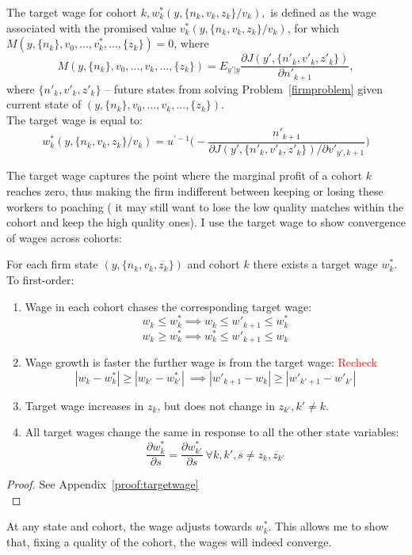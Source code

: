  \begin{definition} 
  The target wage for cohort $k, w^*_k(y,\{n_k,v_k,z_k\}/v_k),$ is defined as the wage associated with the promised value $v^*_k(y,\{n_k,v_k,z_k\}/v_k)$, for which $M(y,\{n_k\},v_0,...,v^*_k,...,\{z_k\})=0$, where
  \[M(y,\{n_k\},v_0,...,v_k,...,\{z_k\}) = E_{y'|y}\frac{\partial J(y',\{n'_k,v'_k,z'_k\})}{\partial n'_{k+1}},\]
  where $\{n'_k,v'_k,z'_k\}$ -- future states from solving Problem~\ref{firmproblem} given current state of $(y,\{n_k\},v_0,...,v_k,...,\{z_k\})$. \\
  The target wage is equal to:
  \[ w^*_k (y,\{n_k,v_k,z_k\}/v_k) = u^{'-1}\Big( - \frac{n'_{k+1}}{\partial J(y',\{n'_k,v'_k,z'_k\})/\partial v'_{y',k+1}} \Big)\]
 \end{definition}
The target wage captures the point where the marginal profit of a cohort $k$ reaches zero, thus making the firm indifferent between keeping or losing these workers to poaching ( it may still want to lose the low quality matches within the cohort and keep the high quality ones). I use the target wage to show convergence of wages across cohorts:
\begin{proposition} \label{prop:targetwage}
 For each firm state $(y,\{n_k,v_k,z_k\})$ and cohort $k$ there exists a target wage $w^*_k$. To first-order:
  \begin{enumerate}
    \item Wage in each cohort chases the corresponding target wage: 
    \[ w_k \leq w^*_k  \implies w_k \leq w'_{k+1} \leq w^*_k\]
    \[w_k \geq w^*_k  \implies w^*_k \leq w'_{k+1} \leq w_k\]
    \item Wage growth is faster the further wage is from the target wage: \textcolor{red}{Recheck} 
    \[|w_k-w^*_k|\geq|w_{k'}-w^*_{k'}|\: \implies |w'_{k+1}-w_k|\geq|w'_{k'+1}-w'_{k'}| \]
    \item Target wage increases in $z_k$, but does not change in $z_{k'},k'\neq k$.
    \item All target wages change the same in response to all the other state variables:
    \[\frac{\partial w^*_k}{\partial s} = \frac{\partial w^*_{k'}}{\partial s}\:  \forall k,k', s\neq z_k,z_{k'}\]
  \end{enumerate}
\end{proposition}
\begin{proof}
  See Appendix~\ref{proof:targetwage} \\

\end{proof}
At any state and cohort, the wage adjusts towards $w^*_k$. This allows me to show that, fixing a quality of the cohort, the wages will indeed converge.
